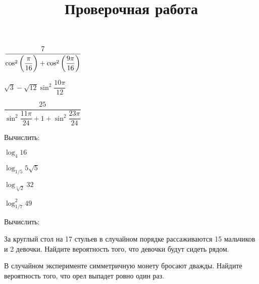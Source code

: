 \begin{listofex}
\begin{enumcols}[itemcolumns=2]
		\item \( \dfrac{7}{\cos^2\left( \dfrac{\vphantom{9}\pi}{16} \right)+\cos^2\left( \dfrac{9\pi}{16} \right)} \) 
		\item \( \sqrt{3}-\sqrt{12}\sin^2\dfrac{10\pi}{12} \) 
		\item \( \dfrac{25}{\sin^2\dfrac{11\pi}{24}+1+\sin^2\dfrac{23\pi}{24}} \)
	\end{enumcols}
	\item Вычислить:
	\begin{enumcols}[itemcolumns=4]
		\item \( \log_4 16 \)
		\item \( \log_{1/5}5\sqrt{5} \)
		\item \( \log_{\sqrt[5]{2}}32 \)
		\item \( \log_{1/7}^2 49 \)
	\end{enumcols}
	\item Вычислить:
	\begin{enumcols}[itemcolumns=1]
		\item {}
		\item {}
	\end{enumcols}
	\item За круглый стол на 17 стульев в случайном порядке рассаживаются 15 мальчиков и 2 девочки. Найдите вероятность того, что девочки будут сидеть рядом.
	\item В случайном эксперименте симметричную монету бросают дважды. Найдите вероятность того, что орел выпадет ровно один раз.
\end{listofex}
\newpage
\title{Проверочная работа}
